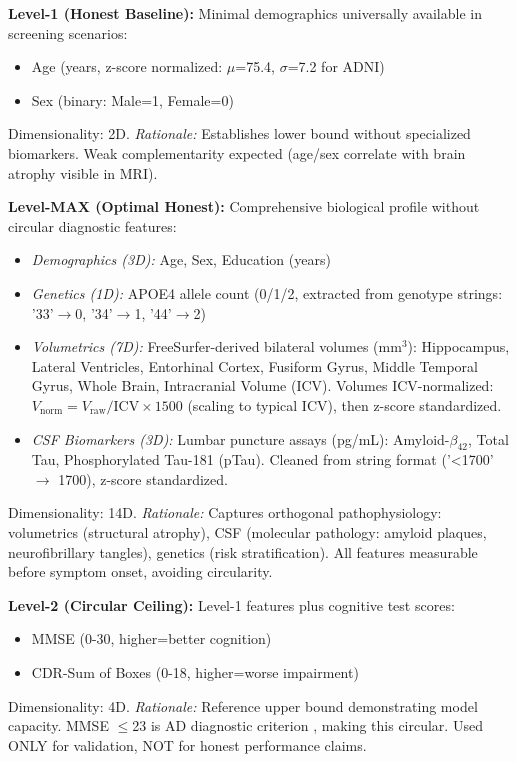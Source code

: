\documentclass[conference]{IEEEtran}
\begin{document}
\textbf{Level-1 (Honest Baseline):} Minimal demographics universally available in screening scenarios:
\begin{itemize}
\item Age (years, z-score normalized: $\mu$=75.4, $\sigma$=7.2 for ADNI)
\item Sex (binary: Male=1, Female=0)
\end{itemize}
Dimensionality: 2D. \textit{Rationale:} Establishes lower bound without specialized biomarkers. Weak complementarity expected (age/sex correlate with brain atrophy visible in MRI).

\textbf{Level-MAX (Optimal Honest):} Comprehensive biological profile without circular diagnostic features:
\begin{itemize}
\item \textit{Demographics (3D):} Age, Sex, Education (years)
\item \textit{Genetics (1D):} APOE4 allele count (0/1/2, extracted from genotype strings: '33'$\rightarrow$0, '34'$\rightarrow$1, '44'$\rightarrow$2)
\item \textit{Volumetrics (7D):} FreeSurfer-derived \cite{Fischl2012} bilateral volumes (mm$^3$): Hippocampus, Lateral Ventricles, Entorhinal Cortex, Fusiform Gyrus, Middle Temporal Gyrus, Whole Brain, Intracranial Volume (ICV). Volumes ICV-normalized: $V_{\text{norm}} = V_{\text{raw}} / \text{ICV} \times 1500$ (scaling to typical ICV), then z-score standardized.
\item \textit{CSF Biomarkers (3D):} Lumbar puncture assays (pg/mL): Amyloid-$\beta_{42}$, Total Tau, Phosphorylated Tau-181 (pTau). Cleaned from string format ('<1700' $\rightarrow$ 1700), z-score standardized.
\end{itemize}
Dimensionality: 14D. \textit{Rationale:} Captures orthogonal pathophysiology: volumetrics (structural atrophy), CSF (molecular pathology: amyloid plaques, neurofibrillary tangles), genetics (risk stratification). All features measurable before symptom onset, avoiding circularity.

\textbf{Level-2 (Circular Ceiling):} Level-1 features plus cognitive test scores:
\begin{itemize}
\item MMSE (0-30, higher=better cognition)
\item CDR-Sum of Boxes (0-18, higher=worse impairment)
\end{itemize}
Dimensionality: 4D. \textit{Rationale:} Reference upper bound demonstrating model capacity. MMSE $\leq$23 is AD diagnostic criterion \cite{McKhann2011}, making this circular. Used ONLY for validation, NOT for honest performance claims.
\end{document}
